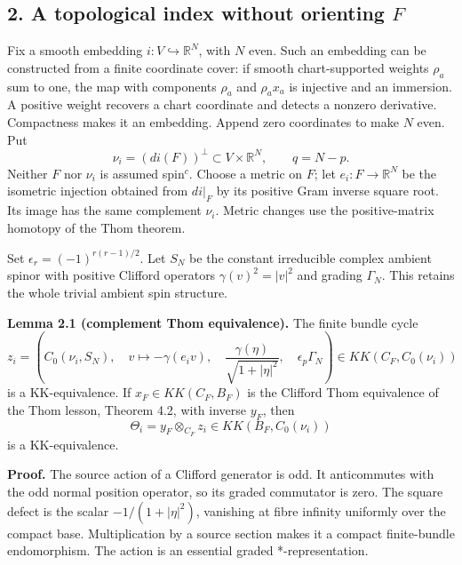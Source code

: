 \documentclass[
  11pt,
]{article}
\begin{document}
\subsection{\texorpdfstring{2. A topological index without orienting
\(F\)}{2. A topological index without orienting F}}\label{a-topological-index-without-orienting-f}

Fix a smooth embedding \(i:V\hookrightarrow\mathbb R^N\), with \(N\)
even. Such an embedding can be constructed from a finite coordinate
cover: if smooth chart-supported weights \(\rho_a\) sum to one, the map
with components \(\rho_a\) and \(\rho_ax_a\) is injective and an
immersion. A positive weight recovers a chart coordinate and detects a
nonzero derivative. Compactness makes it an embedding. Append zero
coordinates to make \(N\) even. Put \[
 \nu_i=(di(F))^\perp\subset V\times\mathbb R^N,\qquad q=N-p.
 \tag{2.1}
\] Neither \(F\) nor \(\nu_i\) is assumed spin\(^{c}\). Choose a metric
on \(F\); let \(e_i:F\to\mathbb R^N\) be the isometric injection
obtained from \(di|_F\) by its positive Gram inverse square root. Its
image has the same complement \(\nu_i\). Metric changes use the
positive-matrix homotopy of the Thom theorem.

Set \(\epsilon_r=(-1)^{r(r-1)/2}\). Let \(S_N\) be the constant
irreducible complex ambient spinor with positive Clifford operators
\(\gamma(v)^2=|v|^2\) and grading \(\Gamma_N\). This retains the whole
trivial ambient spin structure.

\textbf{Lemma 2.1 (complement Thom equivalence).} The finite bundle
cycle \[
 z_i=\left(C_0(\nu_i,S_N),\quad
 v\longmapsto-\gamma(e_i v),\quad
 \frac{\gamma(\eta)}{\sqrt{1+|\eta|^2}},\quad
 \epsilon_p\Gamma_N\right)
 \in KK(C_F,C_0(\nu_i))
 \tag{2.2}
\] is a KK-equivalence. If \(x_F\in KK(C_F,B_F)\) is the Clifford Thom
equivalence of the Thom lesson, Theorem 4.2, with inverse \(y_F\), then
\[
 \Theta_i=y_F\otimes_{C_F}z_i
 \in KK(B_F,C_0(\nu_i))
 \tag{2.3}
\] is a KK-equivalence.

\textbf{Proof.} The source action of a Clifford generator is odd. It
anticommutes with the odd normal position operator, so its graded
commutator is zero. The square defect is the scalar \(-1/(1+|\eta|^2)\),
vanishing at fibre infinity uniformly over the compact base.
Multiplication by a source section makes it a compact finite-bundle
endomorphism. The action is an essential graded *-representation.
\end{document}

